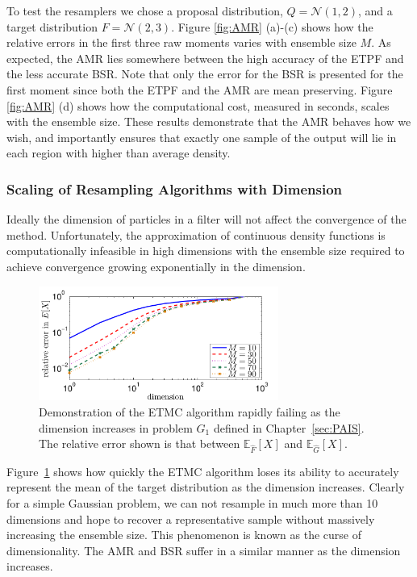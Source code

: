 \documentclass[final]{siamltex}
\begin{document}
To test the resamplers we chose a proposal distribution, $Q = \mathcal{N}(1,2)$, and a target
distribution $F = \mathcal{N}(2,3)$. Figure \ref{fig:AMR} (a)-(c) shows how the relative errors in
the first three raw moments varies with ensemble size $M$. As expected, the AMR lies somewhere
between the high accuracy of the ETPF and the less accurate BSR. Note that only the error for the
BSR is presented for the first moment since both the ETPF and the AMR are mean preserving. Figure
\ref{fig:AMR} (d) shows how the computational cost, measured in seconds, scales with the ensemble
size. These results demonstrate that the AMR behaves how we wish, and importantly ensures that
exactly one sample of the output will lie in each region with higher than average density.


\subsubsection{Scaling of Resampling Algorithms with Dimension}
Ideally the dimension of particles in a filter will not affect the convergence of the method.
Unfortunately, the approximation of continuous density functions is computationally infeasible in
high dimensions with the ensemble size required to achieve convergence growing exponentially in the
dimension\cite{silverman1986density,snyder2008obstacles}.

\begin{figure}[htb]
\begin{center}
\includegraphics[width=0.7\textwidth]{images/ET_dim_scaling}
\caption{Demonstration of the ETMC algorithm rapidly failing as the dimension increases in problem
$G_1$ defined in Chapter~\ref{sec:PAIS}. The relative error shown is that between $\mathbb{E}_{\hat{F}}[X]$ and $\mathbb{E}_{\hat{G}}[X]$.}
\label{fig:ET_dim_scaling}
\end{center}
\end{figure}

Figure~\ref{fig:ET_dim_scaling} shows how quickly the ETMC algorithm loses its ability to accurately
represent the mean of the target distribution as the dimension increases. Clearly for a simple
Gaussian problem, we can not resample in much more than 10 dimensions and hope to recover a
representative sample without massively increasing the ensemble size. This phenomenon is known as
the curse of dimensionality. The AMR and BSR suffer in a similar manner as the dimension increases.
\end{document}
